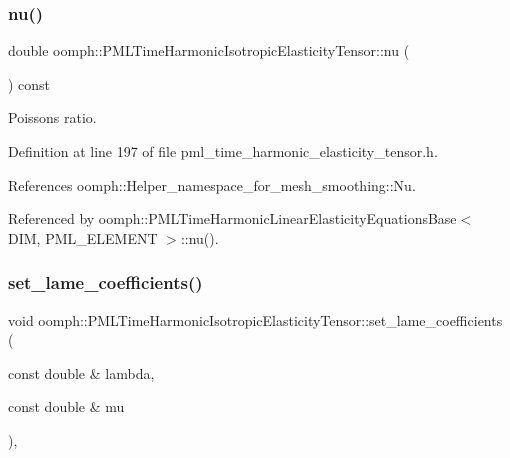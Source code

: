 \subsubsection{\texorpdfstring{nu()}{nu()}}
{\footnotesize\ttfamily double oomph\+::\+P\+M\+L\+Time\+Harmonic\+Isotropic\+Elasticity\+Tensor\+::nu (\begin{DoxyParamCaption}{ }\end{DoxyParamCaption}) const\hspace{0.3cm}{\ttfamily [inline]}}



Poisson\textquotesingle{}s ratio. 



Definition at line 197 of file pml\+\_\+time\+\_\+harmonic\+\_\+elasticity\+\_\+tensor.\+h.



References oomph\+::\+Helper\+\_\+namespace\+\_\+for\+\_\+mesh\+\_\+smoothing\+::\+Nu.



Referenced by oomph\+::\+P\+M\+L\+Time\+Harmonic\+Linear\+Elasticity\+Equations\+Base$<$ D\+I\+M, P\+M\+L\+\_\+\+E\+L\+E\+M\+E\+N\+T $>$\+::nu().

\mbox{\label{classoomph_1_1PMLTimeHarmonicIsotropicElasticityTensor_ae0b7edb4584cac4bfdf2cf9b74486a23}} 
\subsubsection{\texorpdfstring{set\+\_\+lame\+\_\+coefficients()}{set\_lame\_coefficients()}}
{\footnotesize\ttfamily void oomph\+::\+P\+M\+L\+Time\+Harmonic\+Isotropic\+Elasticity\+Tensor\+::set\+\_\+lame\+\_\+coefficients (\begin{DoxyParamCaption}\item[{const double \&}]{lambda,  }\item[{const double \&}]{mu }\end{DoxyParamCaption})\hspace{0.3cm}{\ttfamily [inline]}, {\ttfamily [private]}}



